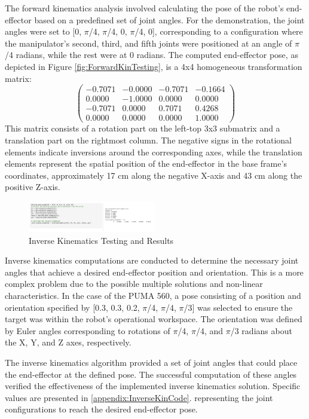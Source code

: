 \documentclass[conference]{IEEEtran}
\begin{document}
The forward kinematics analysis involved calculating the pose of the robot's end-effector based on a predefined set of joint angles. For the demonstration, the joint angles were set to [0, $\pi$/4, $\pi$/4, 0, $\pi$/4, 0], corresponding to a configuration where the manipulator's second, third, and fifth joints were positioned at an angle of $\pi$/4 radians, while the rest were at 0 radians. The computed end-effector pose, as depicted in Figure \ref{fig:ForwardKinTesting}, is a 4x4 homogeneous transformation matrix:
\[
\begin{pmatrix}
-0.7071 & -0.0000 & -0.7071 & -0.1664 \\
0.0000 & -1.0000 & 0.0000 & 0.0000 \\
-0.7071 & 0.0000 & 0.7071 & 0.4268 \\
0.0000 & 0.0000 & 0.0000 & 1.0000
\end{pmatrix}
\]
This matrix consists of a rotation part on the left-top  3x3 submatrix and a translation part on the rightmost column. The negative signs in the rotational elements indicate inversions around the corresponding axes, while the translation elements represent the spatial position of the end-effector in the base frame's coordinates, approximately 17 cm along the negative X-axis and 43 cm along the positive Z-axis.

\begin{figure}[H]
    \centering
    \includegraphics[width=0.5\textwidth]{inverseKinTesting.png}
    \caption{Inverse Kinematics Testing and Results}
    \label{fig:InverseKinTesting}
\end{figure}
Inverse kinematics computations are conducted to determine the necessary joint angles that achieve a desired end-effector position and orientation. This is a more complex problem due to the possible multiple solutions and non-linear characteristics. In the case of the PUMA 560, a pose consisting of a position and orientation specified by [0.3, 0.3, 0.2, $\pi$/4, $\pi$/4, $\pi$/3] was selected to ensure the target was within the robot's operational workspace. The orientation was defined by Euler angles corresponding to rotations of $\pi$/4, $\pi$/4, and $\pi$/3 radians about the X, Y, and Z axes, respectively.

The inverse kinematics algorithm provided a set of joint angles that could place the end-effector at the defined pose. The successful computation of these angles verified the effectiveness of the implemented inverse kinematics solution. Specific values are presented in \ref{appendix:InverseKinCode}. representing the joint configurations to reach the desired end-effector pose.
\end{document}
